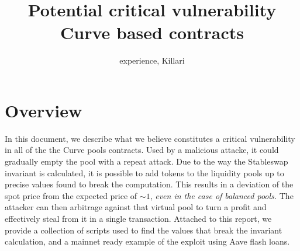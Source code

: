 \documentclass{article}
\title{Potential critical vulnerability Curve based contracts}
\author{experience, Killari}
\begin{document}
    \maketitle

    \section{Overview}

    In this document, we describe what we believe constitutes a critical vulnerability in all of the the Curve pools contracts. Used by a malicious attacke, it could gradually empty the pool with a repeat attack.  Due to the way the Stableswap invariant is calculated, it is possible to add tokens to the liquidity pools up to precise values found to break the computation. This results in a deviation of the spot price from the expected price of $\sim 1$, \textit{even in the case of balanced pools.} The attacker can then arbitrage against that virtual pool to turn a profit and effectively steal from it in a single transaction. Attached to this report, we provide a collection of scripts used to find the values that break the invariant calculation, and a mainnet ready example of the exploit using Aave flash loans. 
\end{document}
